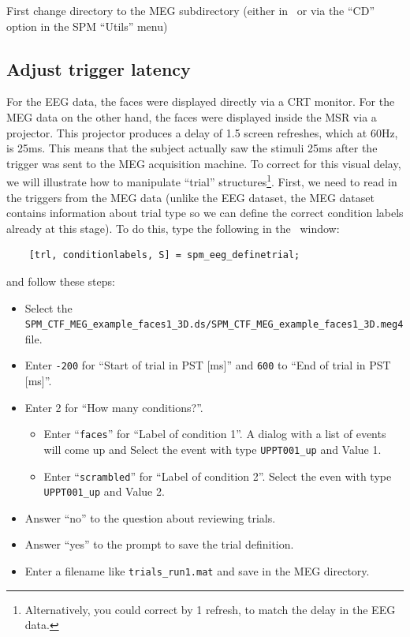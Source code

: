 First change directory to the MEG subdirectory (either in \matlab\, or via the ``CD'' option in the SPM ``Utils'' menu)

\subsection{Adjust trigger latency}

For the EEG data, the faces were displayed directly via a CRT monitor. For the MEG data on the other hand, the faces were displayed inside the MSR via a projector. This projector produces a delay of 1.5 screen refreshes, which at 60Hz, is 25ms. This means that the subject actually saw the stimuli 25ms after the trigger was sent to the MEG acquisition machine. To correct for this visual delay, we will illustrate how to manipulate ``trial'' structures\footnote{Alternatively, you could correct by 1 refresh, to match the delay in the EEG data.}. First, we need to read in the triggers from the MEG data (unlike the EEG dataset, the MEG dataset contains information about trial type so we can define the correct condition labels already at this stage). To do this, type the following in the \matlab\ window:

\begin{verbatim}
    [trl, conditionlabels, S] = spm_eeg_definetrial;
\end{verbatim}

and follow these steps:
\begin{itemize}
 \item Select the \texttt{SPM\_CTF\_MEG\_example\_faces1\_3D.ds/SPM\_CTF\_MEG\_example\_faces1\_3D.meg4} file.
 \item Enter \texttt{-200} for ``Start of trial in PST [ms]'' and \texttt{600} to ``End of trial in PST [ms]''.
 \item Enter 2 for ``How many conditions?''.
 \begin{itemize}
  \item Enter ``\texttt{faces}'' for ``Label of condition 1''. A dialog with a list of events will come up and Select the event with type \texttt{UPPT001\_up} and Value 1.
  \item Enter ``\texttt{scrambled}'' for ``Label of condition 2''. Select the even with type \texttt{UPPT001\_up} and Value 2.
 \end{itemize}
 \item Answer ``no'' to the question about reviewing trials.
 \item Answer ``yes'' to the prompt to save the trial definition.
 \item Enter a filename like \texttt{trials\_run1.mat} and save in the MEG directory.
\end{itemize}


